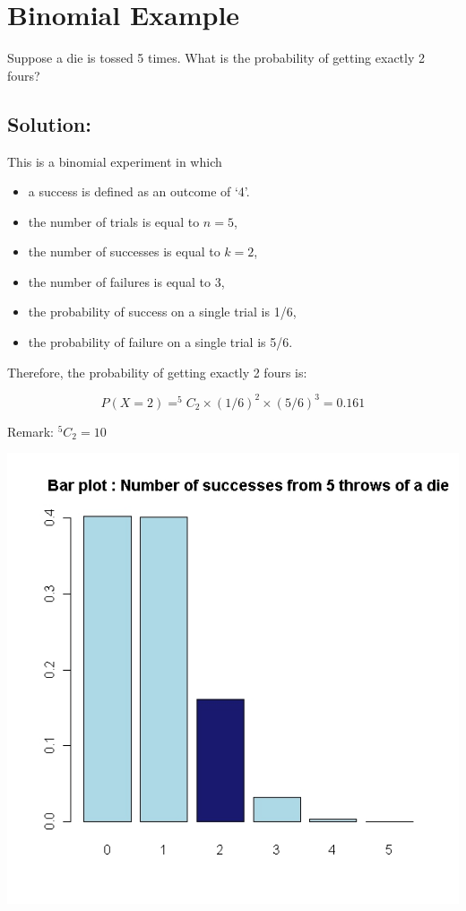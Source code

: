 

\section*{Binomial Example }

Suppose a die is tossed 5 times. What is the probability of getting exactly 2 fours?

\subsection*{Solution:}

This is a binomial experiment in which \begin{itemize}\item a success is defined as an outcome of `4'. \item the number of trials is equal to $n=5$, \item the number of successes is equal to $k=2$,\item the number of failures is equal to 3, \item  the probability of success on a single trial is 1/6, \item  the probability of failure on a single trial is 5/6.\end{itemize}

\smallskip

Therefore, the probability of getting exactly 2 fours is:

\[P(X=2) = ^5C_2 \times (1/6)^2 \times (5/6)^3 = 0.161\]

Remark: $^5C_2 = 10$\\
\bigskip

\begin{center}
\includegraphics[scale=0.40]{images/3Bbarplot4}
\end{center}


